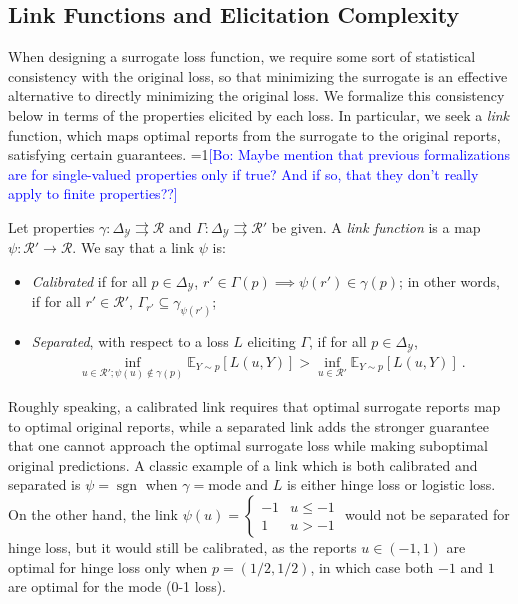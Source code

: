 \documentclass[anon,12pt]{colt2019}
\newcommand{\Comments}{1}
\newcommand{\mynote}[2]{\ifnum\Comments=1\textcolor{#1}{#2}\fi}
\newcommand{\bo}[1]{\mynote{blue}{[Bo: #1]}}
\newcommand{\mode}{\mathrm{mode}}
\newcommand{\simplex}{\Delta_\Y}
\newcommand{\E}{\mathbb{E}}
\newcommand{\R}{\mathcal{R}}
\newcommand{\Y}{\mathcal{Y}}
\newcommand{\toto}{\rightrightarrows}
\DeclareMathOperator*{\sgn}{sgn}
\begin{document}
\subsection{Link Functions and Elicitation Complexity}\label{sec:link-elic}

When designing a surrogate loss function, we require some sort of statistical consistency with the original loss, so that minimizing the surrogate is an effective alternative to directly minimizing the original loss.
We formalize this consistency below in terms of the properties elicited by each loss.
In particular, we seek a \emph{link} function, which maps optimal reports from the surrogate to the original reports, satisfying certain guarantees.
\bo{Maybe mention that previous formalizations are for single-valued properties only if true? And if so, that they don't really apply to finite properties??}

\begin{definition}\label{def:links}
  Let properties $\gamma:\simplex\toto\R$ and $\Gamma:\simplex\toto\R'$ be given.
  A \emph{link function} is a map $\psi:\R'\to\R$.
  We say that a link $\psi$ is:
  \begin{itemize}
  \item \emph{Calibrated} if for all $p\in\simplex$, $r'\in \Gamma(p) \implies \psi(r') \in \gamma(p)$; in other words, if for all $r'\in\R'$, $\Gamma_{r'} \subseteq \gamma_{\psi(r')}$;
  \item \emph{Separated}, with respect to a loss $L$ eliciting $\Gamma$, if for all $p \in \simplex$,
  \begin{align*}
  \inf_{u \in \R'; \psi(u) \not \in \gamma(p)} \E_{Y\sim p}[L(u, Y)] > \inf_{u \in \R'}\E_{Y\sim p}[L(u, Y)]~.
  \end{align*}
  \end{itemize}
\end{definition}

Roughly speaking, a calibrated link requires that optimal surrogate reports map to optimal original reports, while a separated link adds the stronger guarantee that one cannot approach the optimal surrogate loss while making suboptimal original predictions.
A classic example of a link which is both calibrated and separated is $\psi = \sgn$ when $\gamma=\mode$ and $L$ is either hinge loss or logistic loss.
On the other hand, the link $\psi(u) =
\begin{cases}
  -1 & u \leq -1\\
  1 & u > -1
\end{cases}$
would not be separated for hinge loss, but it would still be calibrated, as the reports $u\in(-1,1)$ are optimal for hinge loss only when $p=(1/2,1/2)$, in which case both $-1$ and $1$ are optimal for the mode (0-1 loss).
\end{document}
